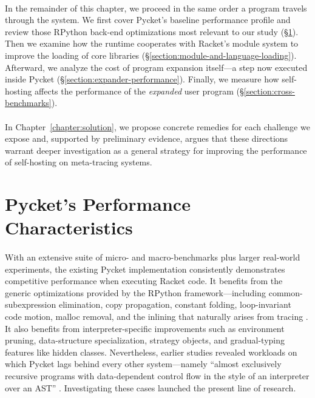 	\paragraph{}%
		In the remainder of this chapter, we proceed in the same order a program travels through the system. We first cover Pycket’s baseline performance profile and review those RPython back-end optimizations most relevant to our study (\S\ref{section:pycket-performance-characteristics}). Then we examine how the runtime cooperates with Racket’s module system to improve the loading of core libraries (\S\ref{section:module-and-language-loading}). Afterward, we analyze the cost of program expansion itself—a step now executed inside Pycket (\S\ref{section:expander-performance}). Finally, we measure how self-hosting affects the performance of the \emph{expanded} user program (\S\ref{section:cross-benchmarks}).

	\paragraph{}%
		In Chapter~\ref{chapter:solution}, we propose concrete remedies for each challenge we expose and, supported by preliminary evidence, argues that these directions warrant deeper investigation as a general strategy for improving the performance of self-hosting on meta-tracing systems.

	\section{Pycket's Performance Characteristics}
	\label{section:pycket-performance-characteristics}

	\paragraph{}%
		With an extensive suite of micro- and macro-benchmarks plus larger real-world experiments, the existing Pycket implementation consistently demonstrates competitive performance when executing Racket code. It benefits from the generic optimizations provided by the RPython framework—including common-subexpression elimination, copy propagation, constant folding, loop-invariant code motion, malloc removal, and the inlining that naturally arises from tracing \cite{loop-aware:12,hotpath:06,malloc-removal:11}. It also benefits from interpreter-specific improvements such as environment pruning, data-structure specialization, strategy objects, and gradual-typing features like hidden classes. Nevertheless, earlier studies revealed workloads on which Pycket lags behind every other system—namely “almost exclusively recursive programs with data-dependent control flow in the style of an interpreter over an AST” \cite{pycketmain,pycketmain2}. Investigating these cases launched the present line of research.

